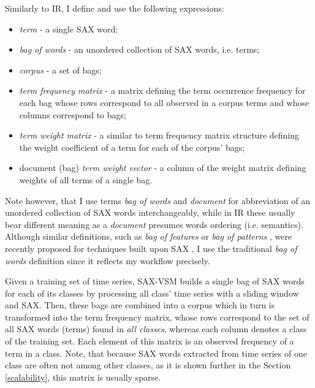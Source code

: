 Similarly to IR, I define and use the following expressions:
\begin{itemize}
  \item \textit{term} - a single SAX word;
  \item \textit{bag of words} - an unordered collection of SAX words, i.e. terms;
  \item \textit{corpus} - a set of bags;
  \item \textit{term frequency matrix} - a matrix defining the term occurrence frequency for each bag  
  whose rows correspond to all observed in a corpus terms and whose columns correspond to bags;
  \item \textit{term weight matrix} - a similar to term frequency matrix structure defining the weight coefficient 
  of a term for each of the corpus' bags;
  \item document (bag) \textit{term weight vector} - a column of the weight matrix defining weights of all terms of a single bag.
\end{itemize}
Note however, that I use terms \textit{bag of words} and \textit{document} for abbreviation of an unordered 
collection of SAX words interchangeably, while in IR these usually bear different meaning as a \textit{document} 
presumes words ordering (i.e. semantics). 
Although similar definitions, such as \textit{bag of features} \cite{citeulike:12636726} 
or \textit{bag of patterns} \cite{citeulike:10525778}, were recently proposed for techniques built 
upon SAX \cite{citeulike:10525778}, I use the traditional \textit{bag of words} definition since it reflects 
my workflow precisely. 

Given a training set of time series, SAX-VSM builds a single bag of SAX words for each of its classes by 
processing all class' time series with a sliding window and SAX. Then, these bags are combined into a corpus 
which in turn is transformed into the term frequency matrix, whose rows correspond to the set of all SAX words (terms) 
found in \textit{all classes}, whereas each column denotes a class of the training set. 
Each element of this matrix is an observed frequency of a term in a class. 
Note, that because SAX words extracted from time series of one class are often not among other classes, 
as it is shown further in the Section \ref{scalability}, this matrix is usually sparse. 

